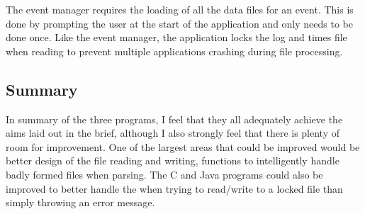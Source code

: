\documentclass{article}
\begin{document}
The event manager requires the loading of all the data files for an event. This is done by prompting the user at the start of the application and only needs to be done once. Like the event manager, the application locks the log and times file when reading to prevent multiple applications crashing during file processing.

\subsection{Summary}
In summary of the three programs, I feel that they all adequately achieve the aims laid out in the brief, although I also strongly feel that there is plenty of room for improvement. One of the largest areas that could be improved would be better design of the file reading and writing, functions to intelligently handle badly formed files when parsing. The C and Java programs could also be improved to better handle the when trying to read/write to a locked file than simply throwing an error message.
\end{document}
